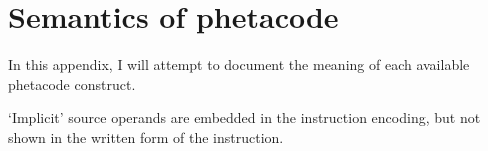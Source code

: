\chapter{Semantics of phetacode}

In this appendix, I will attempt to document the meaning of each available phetacode construct.

`Implicit' source operands are embedded in the instruction encoding, but not shown in the written form of the instruction.

